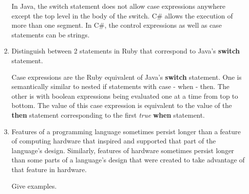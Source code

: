 \begin{enumerate}
\begin{answer}
    In Java, the switch statement does not allow case
    expressions anywhere except the top level in the body
    of the switch.  C\#  allows the execution of more than
    one segment. In C\#, the control expressions as well as
    case statements can be strings.

  \end{answer}

  \item Distinguish between 2 statements in Ruby
    that correspond to Java's \textbf{switch} statement.

  \begin{answer}

    Case expressions are the Ruby equivalent of Java's \textbf{switch}
    statement. One is semantically similar to nested if
    statements with case - when - then. The other is with
    boolean expressions being evaluated one at a time from top
    to bottom. The value of this case expression is equivalent
    to the value of the \textbf{then} statement corresponding to the
    first \textit{true} \textbf{when} statement.

  \end{answer}

  \item Features of a programming language sometimes persist
    longer than a feature of computing hardware that inspired
    and supported that part of the language's design.
    Similarly, features of hardware sometimes persist longer
    than some parts of a language's design that were created
    to take advantage of that feature in hardware.

    Give examples.

  \begin{answer}


\end{answer}
\end{enumerate}
